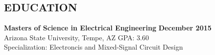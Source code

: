 \documentclass[line, margin]{res}
\begin{document}
\address{253 N 87th Pl \\ Mesa, AZ 85207 \\ (480) 452-4990}

\begin{resume}

\section{EDUCATION}
 \textbf{Masters of Science in Electrical Engineering} \hfill 
 {\bf December 2015}\\ 
 Arizona State University, Tempe, AZ \hfill
 GPA: 3.60 \\
 Specialization: Electroncis and Mixed-Signal Circuit Design

\end{resume}
\end{document}
